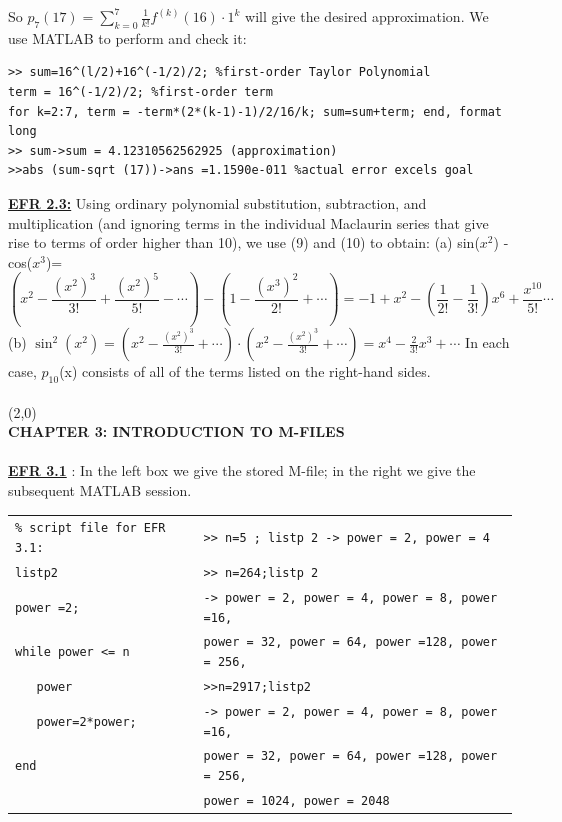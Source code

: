 \documentclass[../main.tex]{subfiles}
\begin{document}
So $p_{7}(17)=\sum_{k=0}^{7} \frac{1}{k !} f^{(k)}(16) \cdot 1^{k}$ will give the desired approximation. We use MATLAB to perform and check it: 
\begin{lstlisting}[numbers=none,frame=none]
 >> sum=16^(l/2)+16^(-1/2)/2; %first-order Taylor Polynomial 
term = 16^(-1/2)/2; %first-order term 
for k=2:7, term = -term*(2*(k-1)-1)/2/16/k; sum=sum+term; end, format 
long 
>> sum->sum = 4.12310562562925 (approximation) 
>>abs (sum-sqrt (17))->ans =1.1590e-011 %actual error excels goal 
\end{lstlisting}
\textbf{\underline{EFR 2.3:}} Using ordinary polynomial substitution, subtraction, and multiplication (and ignoring 
terms in the individual Maclaurin series that give rise to terms of order higher than 10), we use (9) and (10) to obtain: (a) sin($x^2$) - cos($x^3$)=
$$
\left(x^{2}-\frac{\left(x^{2}\right)^{3}}{3 !}+\frac{\left(x^{2}\right)^{5}}{5 !}-\cdots\right)-\left(1-\frac{\left(x^{3}\right)^{2}}{2 !}+\cdots\right)=-1+x^{2}-\left(\frac{1}{2 !}-\frac{1}{3 !}\right) x^{6}+\frac{x^{10}}{5 !} \cdots
$$
(b) $\sin ^{2}\left(x^{2}\right)=\left(x^{2}-\frac{\left(x^{2}\right)^{3}}{3 !}+\cdots\right) \cdot\left(x^{2}-\frac{\left(x^{2}\right)^{3}}{3 !}+\cdots\right)=x^{4}-\frac{2}{3 !} x^{3}+\cdots$
In each case, $p_{10}$(x) consists of all of the terms listed on the right-hand sides. 
\\
\\
\line(2,0){\textwidth}\\
\textbf{CHAPTER 3: INTRODUCTION TO M-FILES }\\
\\
\textbf{\underline{EFR 3.1}} : In the left box we give the stored M-file; in the right we give the subsequent MATLAB session. 
\begin{center}
\begin{tabular}{|l|l|}
\hline
\texttt{\% script file for EFR 3.1:}&\texttt{>> n=5 ; listp 2 -> power = 2, power = 4}\\
\texttt{listp2} &\texttt{>> n=264;listp 2}\\
\texttt{power =2;} &\texttt{-> power = 2, power = 4, power = 8, power =16, }\\
\texttt{while power <= n} &\texttt{power = 32, power = 64, power =128, power = 256,}\\
\texttt{~~~power} &\texttt{>>n=2917;listp2 }\\
\texttt{~~~power=2*power;} &\texttt{-> power = 2, power = 4, power = 8, power =16,}\\
\texttt{end} &\texttt{power = 32, power = 64, power =128, power = 256,}\\
&\texttt{power = 1024, power = 2048}\\
\hline
\end{tabular}
\end{center}
\end{document}
